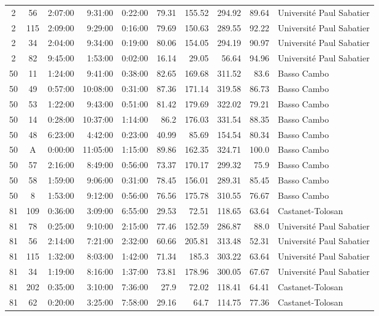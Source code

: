 \documentclass[twoside,12pt]{article}
\begin{document}
\begin{footnotesize}
\begin{longtable}{|c|c|r|r|r|r|r|r|r|l|}
	2	&	56	&	2:07:00	&	9:31:00	&	0:22:00	&	79.31	&	155.52	&	294.92	&	89.64	&	Université Paul Sabatier	\\
	2	&	115	&	2:09:00	&	9:29:00	&	0:16:00	&	79.69	&	150.63	&	289.55	&	92.22	&	Université Paul Sabatier	\\
	2	&	34	&	2:04:00	&	9:34:00	&	0:19:00	&	80.06	&	154.05	&	294.19	&	90.97	&	Université Paul Sabatier	\\
	2	&	82	&	9:45:00	&	1:53:00	&	0:02:00	&	16.14	&	29.05	&	56.64	&	94.96	&	Université Paul Sabatier	\\
	50	&	11	&	1:24:00	&	9:41:00	&	0:38:00	&	82.65	&	169.68	&	311.52	&	83.6	&	Basso Cambo	\\
	50	&	49	&	0:57:00	&	10:08:00	&	0:31:00	&	87.36	&	171.14	&	319.58	&	86.73	&	Basso Cambo	\\
	50	&	53	&	1:22:00	&	9:43:00	&	0:51:00	&	81.42	&	179.69	&	322.02	&	79.21	&	Basso Cambo	\\
	50	&	14	&	0:28:00	&	10:37:00	&	1:14:00	&	86.2	&	176.03	&	331.54	&	88.35	&	Basso Cambo	\\
	50	&	48	&	6:23:00	&	4:42:00	&	0:23:00	&	40.99	&	85.69	&	154.54	&	80.34	&	Basso Cambo	\\
	50	&	A	&	0:00:00	&	11:05:00	&	1:15:00	&	89.86	&	162.35	&	324.71	&	100.0	&	Basso Cambo	\\
	50	&	57	&	2:16:00	&	8:49:00	&	0:56:00	&	73.37	&	170.17	&	299.32	&	75.9	&	Basso Cambo	\\
	50	&	58	&	1:59:00	&	9:06:00	&	0:31:00	&	78.45	&	156.01	&	289.31	&	85.45	&	Basso Cambo	\\
	50	&	8	&	1:53:00	&	9:12:00	&	0:56:00	&	76.56	&	175.78	&	310.55	&	76.67	&	Basso Cambo	\\
	81	&	109	&	0:36:00	&	3:09:00	&	6:55:00	&	29.53	&	72.51	&	118.65	&	63.64	&	Castanet-Tolosan	\\
	81	&	78	&	0:25:00	&	9:10:00	&	2:15:00	&	77.46	&	152.59	&	286.87	&	88.0	&	Université Paul Sabatier	\\
	81	&	56	&	2:14:00	&	7:21:00	&	2:32:00	&	60.66	&	205.81	&	313.48	&	52.31	&	Université Paul Sabatier	\\
	81	&	115	&	1:32:00	&	8:03:00	&	1:42:00	&	71.34	&	185.3	&	303.22	&	63.64	&	Université Paul Sabatier	\\
	81	&	34	&	1:19:00	&	8:16:00	&	1:37:00	&	73.81	&	178.96	&	300.05	&	67.67	&	Université Paul Sabatier	\\
	81	&	202	&	0:35:00	&	3:10:00	&	7:36:00	&	27.9	&	72.02	&	118.41	&	64.41	&	Castanet-Tolosan	\\
	81	&	62	&	0:20:00	&	3:25:00	&	7:58:00	&	29.16	&	64.7	&	114.75	&	77.36	&	Castanet-Tolosan	\\

\end{longtable}
\end{footnotesize}
\end{document}

